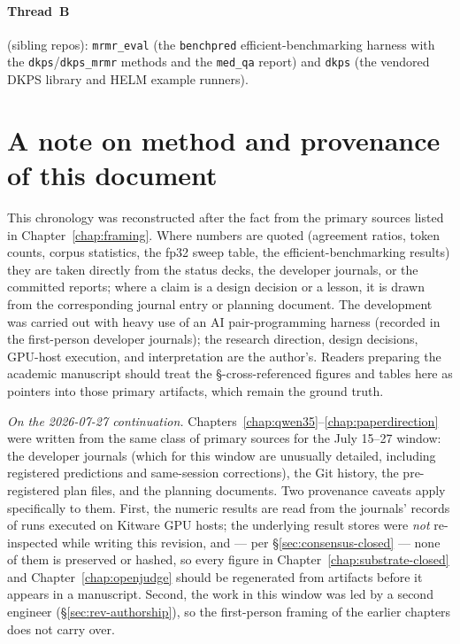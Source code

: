 \documentclass[11pt]{report}
\newcommand{\code}[1]{\texttt{#1}}
\newcommand{\file}[1]{\texttt{#1}}
\begin{document}
\paragraph{Thread~B} (sibling repos): \file{mrmr\_eval} (the \code{benchpred}
efficient-benchmarking harness with the \code{dkps}/\code{dkps\_mrmr} methods and the
\code{med\_qa} report) and \file{dkps} (the vendored DKPS library and HELM example
runners).

\section{A note on method and provenance of this document}

This chronology was reconstructed after the fact from the primary sources listed in
Chapter~\ref{chap:framing}. Where numbers are quoted (agreement ratios, token
counts, corpus statistics, the fp32 sweep table, the efficient-benchmarking results)
they are taken directly from the status decks, the developer journals, or the
committed reports; where a claim is a design decision or a lesson, it is drawn from
the corresponding journal entry or planning document. The development was carried
out with heavy use of an AI pair-programming harness (recorded in the first-person
developer journals); the research direction, design decisions, GPU-host execution,
and interpretation are the author's. Readers preparing the academic manuscript
should treat the \S-cross-referenced figures and tables here as pointers into those
primary artifacts, which remain the ground truth.

\emph{On the 2026-07-27 continuation.} Chapters~\ref{chap:qwen35}--\ref{chap:paperdirection}
were written from the same class of primary sources for the July 15--27 window: the
developer journals (which for this window are unusually detailed, including
registered predictions and same-session corrections), the Git history, the
pre-registered plan files, and the planning documents. Two provenance caveats apply
specifically to them. First, the numeric results are read from the journals'
records of runs executed on Kitware GPU hosts; the underlying result stores were
\emph{not} re-inspected while writing this revision, and --- per
\S\ref{sec:consensus-closed} --- none of them is preserved or hashed, so every figure
in Chapter~\ref{chap:substrate-closed} and Chapter~\ref{chap:openjudge} should be
regenerated from artifacts before it appears in a manuscript. Second, the work in
this window was led by a second engineer (\S\ref{sec:rev-authorship}), so the
first-person framing of the earlier chapters does not carry over.
\end{document}
